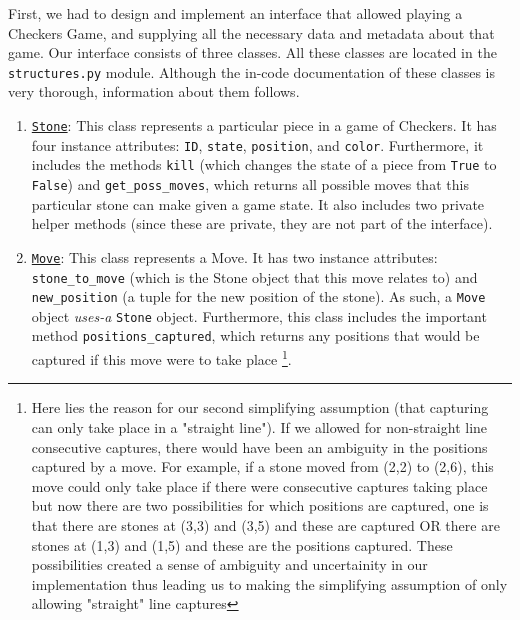 \documentclass[fontsize=11pt]{article}
\begin{document}
First, we had to design and implement an interface that allowed playing a Checkers Game, and supplying all the necessary data and metadata about that game. Our interface consists of three classes. All these classes are located in the \texttt{structures.py} module.
Although the in-code documentation of these classes is very thorough, information about them follows.


\begin{enumerate}
    \item \underline{\texttt{Stone}}: This class represents a particular piece in a game of Checkers. It has four instance attributes: \texttt{ID}, \texttt{state}, \texttt{position}, and \texttt{color}. Furthermore, it includes the methods \texttt{kill} (which changes the state of a piece from \texttt{True} to \texttt{False}) and \texttt{get\_poss\_moves}, which returns all possible moves that this particular stone can make given a game state. It also includes two private helper methods (since these are private, they are not part of the interface).

    
    \item \underline{\texttt{Move}}: This class represents a Move. It has two instance attributes: \texttt{stone\_to\_move} (which is the Stone object that this move relates to) and \texttt{new\_position} (a tuple for the new position of the stone). As such, a \texttt{Move} object \textit{uses-a} \texttt{Stone} object. Furthermore, this class includes the important method \texttt{positions\_captured}, which returns any positions that would be captured if this move were to take place \footnote{Here lies the reason for our second simplifying assumption (that capturing can only take place in a "straight line"). If we allowed for non-straight line consecutive captures, there would have been an ambiguity in the positions captured by a move. For example, if a stone moved from (2,2) to (2,6), this move could only take place if there were consecutive captures taking place but now there are two possibilities for which positions are captured, one is that there are stones at (3,3) and (3,5) and these are captured OR there are stones at (1,3) and (1,5) and these are the positions captured. These possibilities created a sense of ambiguity and uncertainity in our implementation thus leading us to making the simplifying assumption of only allowing "straight" line captures }.



\end{enumerate}
\end{document}
